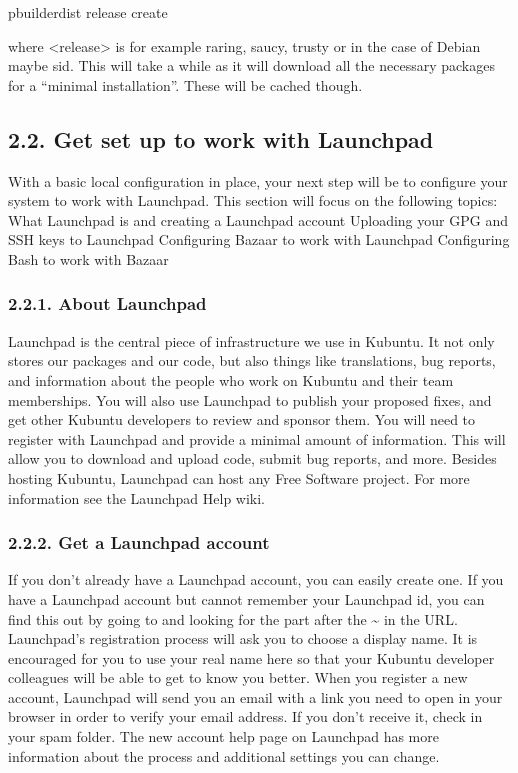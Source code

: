 \documentclass[letterpaper,10pt,english]{sphinxmanual}
\begin{document}
\begin{sphinxVerbatim}[commandchars=\\\{\}]
\PYGZdl{} pbuilder\PYGZhy{}dist \PYGZlt{}release\PYGZgt{} create
\end{sphinxVerbatim}

where \textless{}release\textgreater{} is for example raring, saucy, trusty or in the case of Debian maybe sid. This will take a while as it will download all the necessary packages for a “minimal installation”. These will be cached though.


\subsection{2.2. Get set up to work with Launchpad}
\label{\detokenize{docs/packaging_guide/getting_started:get-set-up-to-work-with-launchpad}}
With a basic local configuration in place, your next step will be to configure your system to work with Launchpad. This section will focus on the following topics:
What Launchpad is and creating a Launchpad account
Uploading your GPG and SSH keys to Launchpad
Configuring Bazaar to work with Launchpad
Configuring Bash to work with Bazaar


\subsubsection{2.2.1. About Launchpad}
\label{\detokenize{docs/packaging_guide/getting_started:about-launchpad}}
Launchpad is the central piece of infrastructure we use in Kubuntu. It not only stores our packages and our code, but also things like translations, bug reports, and information about the people who work on Kubuntu and their team memberships. You will also use Launchpad to publish your proposed fixes, and get other Kubuntu developers to review and sponsor them.
You will need to register with Launchpad and provide a minimal amount of information. This will allow you to download and upload code, submit bug reports, and more.
Besides hosting Kubuntu, Launchpad can host any Free Software project. For more information see the Launchpad Help wiki.


\subsubsection{2.2.2. Get a Launchpad account}
\label{\detokenize{docs/packaging_guide/getting_started:get-a-launchpad-account}}
If you don’t already have a Launchpad account, you can easily create one. If you have a Launchpad account but cannot remember your Launchpad id, you can find this out by going to  and looking for the part after the \textasciitilde{} in the URL.
Launchpad’s registration process will ask you to choose a display name. It is encouraged for you to use your real name here so that your Kubuntu developer colleagues will be able to get to know you better.
When you register a new account, Launchpad will send you an email with a link you need to open in your browser in order to verify your email address. If you don’t receive it, check in your spam folder.
The new account help page on Launchpad has more information about the process and additional settings you can change.
\end{document}
